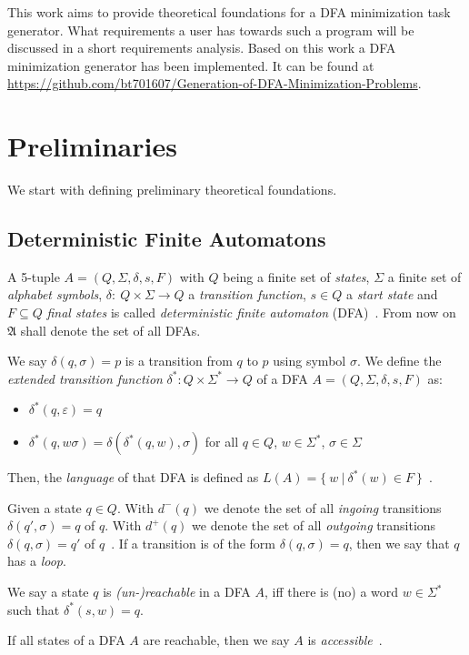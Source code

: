 This work aims to provide theoretical foundations for a DFA minimization task generator. What requirements a user has towards such a program will be discussed in a short requirements analysis. Based on this work a DFA minimization generator has been implemented. It can be found at \url{https://github.com/bt701607/Generation-of-DFA-Minimization-Problems}.

\section{Preliminaries}

We start with defining preliminary theoretical foundations.

\subsection{Deterministic Finite Automatons}

A 5-tuple $A = (Q, \Sigma, \delta, s, F)$ with $Q$ being a finite set of \emph{states}, $\Sigma$ a finite set of \emph{alphabet symbols}, $\delta \colon\ Q \times \Sigma \to Q$ a \emph{transition function}, $s \in Q$ a \emph{start state} and $F \subseteq Q$ \emph{final states} is called \emph{deterministic finite automaton} (DFA)~\cite[p. 46]{HMU01}. From now on $\mathfrak{A}$ shall denote the set of all DFAs.

We say $\delta(q,\sigma) = p$ is a transition from $q$ to $p$ using symbol $\sigma$. We define the \emph{extended transition function} $\delta^* : Q \times \Sigma^* \to Q$ of a DFA $A = (Q, \Sigma, \delta, s, F)$ as:
\begin{itemize}
	\item $\delta^*(q,\varepsilon) = q$
	\item $\delta^*(q,w\sigma) = \delta(\delta^*(q,w),\sigma)$ for all $q \in Q$, $w \in \Sigma^*$, $\sigma \in \Sigma$
\end{itemize}
Then, the \emph{language} of that DFA is defined as $L(A) = \{\ w\ |\ \delta^*(w) \in F\ \}$~\cite[pp. 49-50. 52]{HMU01}.

Given a state $q \in Q$. With $d^-(q)$ we denote the set of all \emph{ingoing} transitions $\delta(q', \sigma) = q$ of $q$. With $d^+(q)$ we denote the set of all \emph{outgoing} transitions $\delta(q, \sigma) = q'$ of $q$~\cite[pp. 2-3]{CP05}. If a transition is of the form $\delta(q, \sigma) = q$, then we say that $q$ has a \emph{loop}.

\begin{definition}\label{ch:1:unreachable-states}
	We say a state $q$ is \emph{(un-)reachable} in a DFA $A$, iff there is (no) a word $w \in \Sigma^*$ such that $\delta^*(s, w) = q$.
\end{definition}
\noindent If all states of a DFA $A$ are reachable, then we say $A$ is \emph{accessible}~\cite[p. 2]{CP05}.

